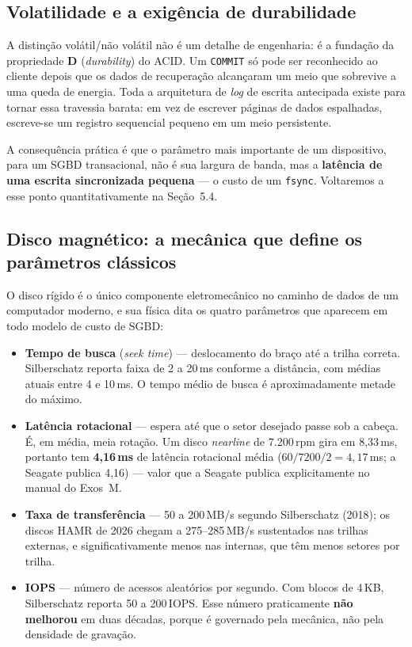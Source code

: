 \documentclass[11pt,a4paper]{article}
\begin{document}
\subsection{Volatilidade e a exigência de durabilidade}

A distinção volátil/não volátil não é um detalhe de engenharia: é a fundação da propriedade
\textbf{D} (\emph{durability}) do ACID. Um \texttt{COMMIT} só pode ser reconhecido ao
cliente depois que os dados de recuperação alcançaram um meio que sobrevive a uma queda de
energia. Toda a arquitetura de \emph{log} de escrita antecipada existe para tornar essa
travessia barata: em vez de escrever páginas de dados espalhadas, escreve-se um registro
sequencial pequeno em um meio persistente.

A consequência prática é que o parâmetro mais importante de um dispositivo, para um SGBD
transacional, não é sua largura de banda, mas a \textbf{latência de uma escrita sincronizada
pequena} --- o custo de um \texttt{fsync}. Voltaremos a esse ponto quantitativamente na
Seção~5.4.

\subsection{Disco magnético: a mecânica que define os parâmetros clássicos}

O disco rígido é o único componente eletromecânico no caminho de dados de um computador
moderno, e sua física dita os quatro parâmetros que aparecem em todo modelo de custo de
SGBD:

\begin{itemize}
\item \textbf{Tempo de busca} (\emph{seek time}) --- deslocamento do braço até a trilha
      correta. Silberschatz reporta faixa de 2 a 20\,ms conforme a distância, com médias
      atuais entre 4 e 10\,ms. O tempo médio de busca é aproximadamente metade do máximo.
\item \textbf{Latência rotacional} --- espera até que o setor desejado passe sob a cabeça.
      É, em média, meia rotação. Um disco \emph{nearline} de 7.200\,rpm gira em 8,33\,ms,
      portanto tem \textbf{4,16\,ms} de latência rotacional média ($60/7200/2 = 4{,}17$\,ms; a
      Seagate publica 4,16) --- valor que a Seagate
      publica explicitamente no manual do Exos~M.
\item \textbf{Taxa de transferência} --- 50 a 200\,MB/s segundo Silberschatz (2018); os
      discos HAMR de 2026 chegam a 275--285\,MB/s sustentados nas trilhas externas, e
      significativamente menos nas internas, que têm menos setores por trilha.
\item \textbf{IOPS} --- número de acessos aleatórios por segundo. Com blocos de 4\,KB,
      Silberschatz reporta 50 a 200\,IOPS. Esse número praticamente \textbf{não melhorou}
      em duas décadas, porque é governado pela mecânica, não pela densidade de gravação.
\end{itemize}
\end{document}
